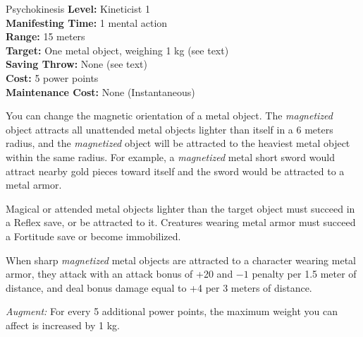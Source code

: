 {Psychokinesis}
{
	\textbf{Level:}
	Kineticist 1\\
	\textbf{Manifesting Time:}
	1 mental action\\
	\textbf{Range:}
	15 meters\\
	\textbf{Target:}
	One metal object, weighing 1 kg (see text)\\
	\textbf{Saving Throw:}
	None (see text)\\
	\textbf{Cost:}
	5 power points\\
	\textbf{Maintenance Cost:}
	None (Instantaneous)\\
}
{
	You can change the magnetic orientation of a metal object. The \emph{magnetized} object attracts all unattended metal objects lighter than itself in a 6 meters radius, and the \emph{magnetized} object will be attracted to the heaviest metal object within the same radius. For example, a \emph{magnetized} metal short sword would attract nearby gold pieces toward itself and the sword would be attracted to a metal armor.

	Magical or attended metal objects lighter than the target object must succeed in a Reflex save, or be attracted to it. Creatures wearing metal armor must succeed a Fortitude save or become immobilized.

	When sharp \emph{magnetized} metal objects are attracted to a character wearing metal armor, they attack with an attack bonus of +20 and $-1$ penalty per 1.5 meter of distance, and deal bonus damage equal to +4 per 3 meters of distance.

	\textit{Augment:} For every 5 additional power points, the maximum weight you can affect is increased by 1 kg.
}